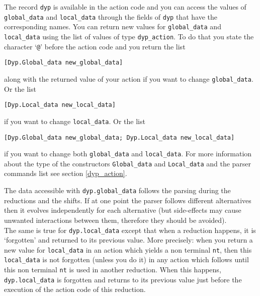 \documentclass[12pt]{article}
\begin{document}
{The record \verb|dyp| is available in the action code and you can access the values of \verb|global_data| and \verb|local_data| through the fields of \verb|dyp| that have the corresponding names. You can return new values for \verb|global_data| and \verb|local_data| using the list of values of type \verb|dyp_action|. To do that you state the character `\verb|@|' before the action code and you return the list
\begin{verbatim}
[Dyp.Global_data new_global_data]
\end{verbatim}
along with the returned value of your action if you want to change \verb|global_data|. Or the list
\begin{verbatim}
[Dyp.Local_data new_local_data]
\end{verbatim}
if you want to change \verb|local_data|. Or the list
\begin{verbatim}
[Dyp.Global_data new_global_data; Dyp.Local_data new_local_data]
\end{verbatim}
if you want to change both \verb|global_data| and \verb|local_data|. For more information about the type of the constructors \verb|Global_data| and \verb|Local_data| and the parser commands list see section \ref{dyp_action}.


The data accessible with \verb|dyp.global_data| follows the parsing during the reductions and the shifts. If at one point the parser follows different alternatives then it evolves independently for each alternative (but side-effects may cause unwanted interactions between them, therefore they should be avoided).\\

The same is true for \texttt{dyp.local\_data} except that when a reduction happens, it is `forgotten' and returned to its previous value. More precisely: when you return a new value for \verb|local_data| in an action which yields a non terminal \texttt{nt}, then this \verb|local_data| is not forgotten (unless you do it) in any action which follows until this non terminal \texttt{nt} is used in another reduction. When this happens, \verb|dyp.local_data| is forgotten and returns to its previous value just before the execution of the action code of this reduction.\\

}
\end{document}
